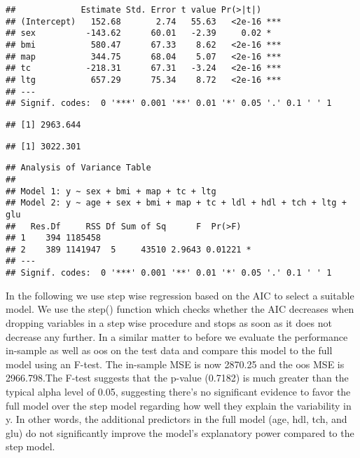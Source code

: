 \documentclass[
]{article}
\begin{document}
\begin{verbatim}
##             Estimate Std. Error t value Pr(>|t|)    
## (Intercept)   152.68       2.74   55.63   <2e-16 ***
## sex          -143.62      60.01   -2.39     0.02 *  
## bmi           580.47      67.33    8.62   <2e-16 ***
## map           344.75      68.04    5.07   <2e-16 ***
## tc           -218.31      67.31   -3.24   <2e-16 ***
## ltg           657.29      75.34    8.72   <2e-16 ***
## ---
## Signif. codes:  0 '***' 0.001 '**' 0.01 '*' 0.05 '.' 0.1 ' ' 1
\end{verbatim}

\begin{verbatim}
## [1] 2963.644
\end{verbatim}

\begin{verbatim}
## [1] 3022.301
\end{verbatim}

\begin{verbatim}
## Analysis of Variance Table
## 
## Model 1: y ~ sex + bmi + map + tc + ltg
## Model 2: y ~ age + sex + bmi + map + tc + ldl + hdl + tch + ltg + glu
##   Res.Df     RSS Df Sum of Sq      F  Pr(>F)  
## 1    394 1185458                              
## 2    389 1141947  5     43510 2.9643 0.01221 *
## ---
## Signif. codes:  0 '***' 0.001 '**' 0.01 '*' 0.05 '.' 0.1 ' ' 1
\end{verbatim}

In the following we use step wise regression based on the AIC to select
a suitable model. We use the step() function which checks whether the
AIC decreases when dropping variables in a step wise procedure and stops
as soon as it does not decrease any further. In a similar matter to
before we evaluate the performance in-sample as well as oos on the test
data and compare this model to the full model using an F-test. The
in-sample MSE is now 2870.25 and the oos MSE is 2966.798.The F-test
suggests that the p-value (0.7182) is much greater than the typical
alpha level of 0.05, suggesting there's no significant evidence to favor
the full model over the step model regarding how well they explain the
variability in y. In other words, the additional predictors in the full
model (age, hdl, tch, and glu) do not significantly improve the model's
explanatory power compared to the step model.
\end{document}
